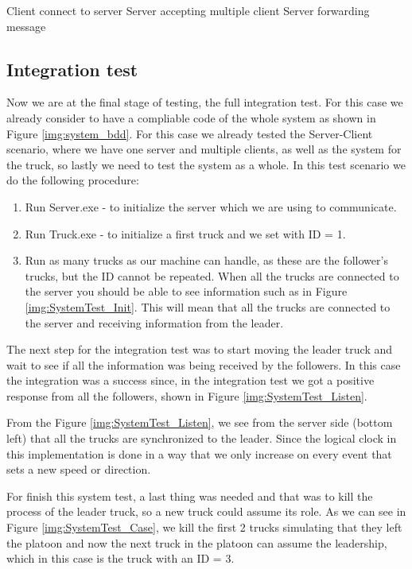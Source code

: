 Client connect to server
Server accepting multiple client
Server forwarding message


\subsection{Integration test}
\label{subsec:integration_test}

Now we are at the final stage of testing, the full integration test. For this case we already consider to have a compliable code of the whole system as shown in Figure \ref{img:system_bdd}. 
For this case we already tested the Server-Client scenario, where we have one server and multiple clients, as well as the system for the truck, so lastly we need to test the system as a whole. In this test scenario we do the following procedure:

\begin{enumerate}
\item 	Run Server.exe - to initialize the server which we are using to communicate.
\item	Run Truck.exe - to initialize a first truck and we set with ID = 1. 
\item	Run as many trucks as our machine can handle, as these are the follower's trucks, but the ID cannot be repeated. When all the trucks are connected to the server you should be able to see information such as in Figure \ref{img:SystemTest_Init}. This will mean that all the trucks are connected to the server and receiving information from the leader.
\end{enumerate}

The next step for the integration test was to start moving the leader truck and wait to see if all the information was being received by the followers. In this case the integration was a success since, in the integration test we got a positive response from all the followers, shown in Figure \ref{img:SystemTest_Listen}.

From the Figure \ref{img:SystemTest_Listen}, we see from the server side (bottom left) that all the trucks are synchronized to the leader. Since the logical clock in this implementation is done in a way that we only increase on every event that sets a new speed or direction. 

For finish this system test, a last thing was needed and that was to kill the process of the leader truck, so a new truck could assume its role. As we can see in Figure \ref{img:SystemTest_Case}, we kill the first 2 trucks simulating that they left the platoon and now the next truck in the platoon can assume the leadership, which in this case is the truck with an ID = 3.

